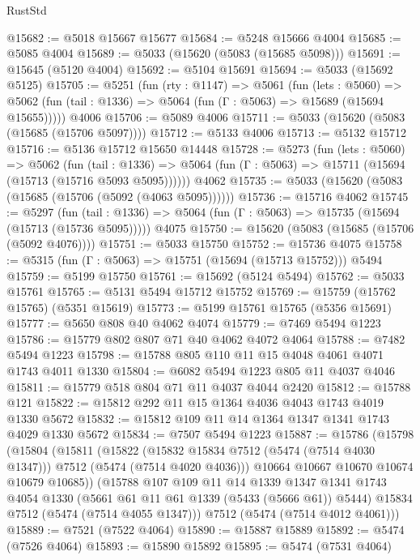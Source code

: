\begin{lexlean}{RustStd}
\begin{coremodule}
@15682 := @5018 @15667 @15677
@15684 := @5248 @15666 @4004
@15685 := @5085 @4004
@15689 := @5033 (@15620 (@5083 (@15685 @5098)))
@15691 := @15645 (@5120 @4004)
@15692 := @5104 @15691
@15694 := @5033 (@15692 @5125)
@15705 := @5251
    (fun (rty : @1147) =>
    @5061
      (fun (lets : @5060) =>
      @5062 (fun (tail : @1336) => @5064 (fun (Γ : @5063) => @15689 (@15694 @15655)))))
    @4006
@15706 := @5089 @4006
@15711 := @5033 (@15620 (@5083 (@15685 (@15706 @5097))))
@15712 := @5133 @4006
@15713 := @5132 @15712
@15716 := @5136 @15712 @15650 @14448
@15728 := @5273
    (fun (lets : @5060) =>
    @5062
      (fun (tail : @1336) =>
      @5064 (fun (Γ : @5063) => @15711 (@15694 (@15713 (@15716 @5093 @5095))))))
    @4062
@15735 := @5033 (@15620 (@5083 (@15685 (@15706 (@5092 (@4063 @5095))))))
@15736 := @15716 @4062
@15745 := @5297
    (fun (tail : @1336) => @5064 (fun (Γ : @5063) => @15735 (@15694 (@15713 (@15736 @5095)))))
    @4075
@15750 := @15620 (@5083 (@15685 (@15706 (@5092 @4076))))
@15751 := @5033 @15750
@15752 := @15736 @4075
@15758 := @5315 (fun (Γ : @5063) => @15751 (@15694 (@15713 @15752))) @5494
@15759 := @5199 @15750
@15761 := @15692 (@5124 @5494)
@15762 := @5033 @15761
@15765 := @5131 @5494 @15712 @15752
@15769 := @15759 (@15762 @15765) (@5351 @15619)
@15773 := @5199 @15761 @15765 (@5356 @15691)
@15777 := @5650 @808 @40 @4062 @4074
@15779 := @7469 @5494 @1223
@15786 := @15779 @802 @807 @71 @40 @4062 @4072 @4064
@15788 := @7482 @5494 @1223
@15798 := @15788 @805 @110 @11 @15 @4048 @4061 @4071 @1743 @4011 @1330
@15804 := @6082 @5494 @1223 @805 @11 @4037 @4046
@15811 := @15779 @518 @804 @71 @11 @4037 @4044 @2420
@15812 := @15788 @121
@15822 := @15812 @292 @11 @15 @1364 @4036 @4043 @1743 @4019 @1330 @5672
@15832 := @15812 @109 @11 @14 @1364 @1347 @1341 @1743 @4029 @1330 @5672
@15834 := @7507 @5494 @1223
@15887 := @15786
    (@15798
      (@15804
        (@15811
          (@15822
            (@15832 @15834 @7512 (@5474 (@7514 @4030 @1347)))
            @7512
            (@5474 (@7514 @4020 @4036)))
          @10664
          @10667
          @10670
          @10674
          @10679
          @10685))
      (@15788
        @107
        @109
        @11
        @14
        @1339
        @1347
        @1341
        @1743
        @4054
        @1330
        (@5661 @61 @11 @61 @1339 (@5433 (@5666 @61)) @5444)
        @15834
        @7512
        (@5474 (@7514 @4055 @1347)))
      @7512
      (@5474 (@7514 @4012 @4061)))
@15889 := @7521 (@7522 @4064)
@15890 := @15887 @15889
@15892 := @5474 (@7526 @4064)
@15893 := @15890 @15892
@15895 := @5474 (@7531 @4064)

\end{coremodule}
\end{lexlean}
